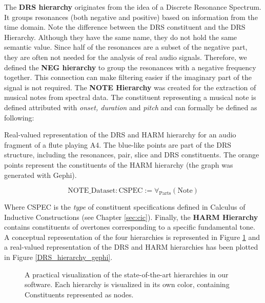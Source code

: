 The \textbf{DRS hierarchy} originates from the idea of a Discrete Resonance Spectrum. It groups resonances (both negative and positive) based on information from the time domain. Note the difference between the DRS constituent and the DRS Hierarchy. Although they have the same name, they do not hold the same semantic value.
Since half of the resonances are a subset of the negative part, they are often not needed for the analysis of real audio signals. Therefore, we defined the \textbf{NEG hierarchy} to group the resonances with a negative frequency together. This connection can make filtering easier if the imaginary part of the signal is not required. The \textbf{NOTE Hierarchy} was created for the extraction of musical notes from spectral data. The constituent representing a musical note is defined attributed with \textit{onset, duration} and \textit{pitch} and can formally be defined as following:
\begin{marginfigure}
\centering

\caption{Real-valued representation of the DRS and HARM hierarchy for an audio fragment of a flute playing A4. The blue-like points are part of the DRS structure, including the resonances, pair, slice and DRS constituents. The orange points represent the constituents of the HARM hierarchy (the graph was generated with Gephi).}
\label{DRS_hierarchy_gephi}
\end{marginfigure}

\begin{equation}
    \text{NOTE\_Dataset}:\text{CSPEC} := \forall_{\text{Parts}}(\text{Note})
\end{equation}

Where CSPEC is the \textit{type} of constituent specifications defined in Calculus of Inductive
Constructions (see Chapter \ref{sec:cic}). Finally, the \textbf{HARM Hierarchy} contains constituents of overtones corresponding to a specific fundamental tone. A conceptual representation of the four hierarchies is represented in Figure \ref{DRS_hierarchy_prac} and a real-valued representation of the DRS and HARM hierarchies has been plotted in Figure \ref{DRS_hierarchy_gephi}.

\begin{figure}[h]
\centering
\vspace{0.5cm}

\vspace{0.1cm}
\caption{A practical visualization of the state-of-the-art hierarchies in our software. Each hierarchy is visualized in its own color, containing Constituents represented as nodes.}
\label{DRS_hierarchy_prac} 
\end{figure}

